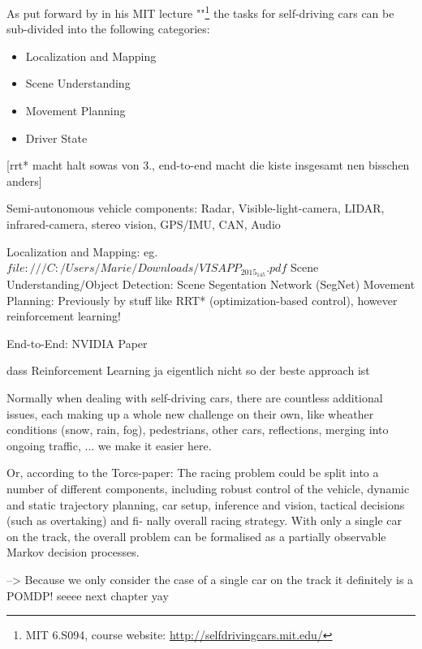 As put forward by  in his MIT lecture ""\footnote{MIT 6.S094, course website: \url{http://selfdrivingcars.mit.edu/}} the tasks for self-driving cars can be sub-divided into the following categories: 
\begin{itemize} \bfseries
	\item Localization and Mapping
	\item Scene Understanding
	\item Movement Planning
	\item Driver State
\end{itemize}
[rrt* macht halt sowas von 3., end-to-end macht die kiste insgesamt nen bisschen anders]

Semi-autonomous vehicle components: Radar, Visible-light-camera, LIDAR, infrared-camera, stereo vision, GPS/IMU, CAN, Audio

Localization and Mapping: eg. $file:///C:/Users/Marie/Downloads/VISAPP_2015_145.pdf$
Scene Understanding/Object Detection: Scene Segentation Network (SegNet)
Movement Planning: Previously by stuff like RRT* (optimization-based control), however reinforcement learning!

End-to-End: NVIDIA Paper

dass Reinforcement Learning ja eigentlich nicht so der beste approach ist


Normally when dealing with self-driving cars, there are countless additional issues, each making up a whole new challenge on their own, like wheather conditions (snow, rain, fog), pedestrians, other cars, reflections, merging into ongoing traffic, ...
we make it easier here.

Or, according to the Torcs-paper:
The racing problem could be split into a number of different components, including
robust control of the vehicle, dynamic and static trajectory planning,
car setup, inference and vision, tactical decisions (such as overtaking) and fi-
nally overall racing strategy. With only a single car on the track, the overall
problem can be formalised as a partially observable Markov decision processes.



--> Because we only consider the case of a  single car on the track it definitely is a POMDP! seeee next chapter yay
